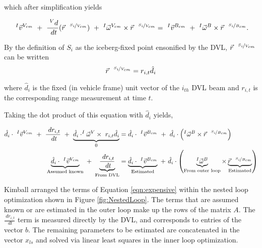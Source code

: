    which after simplification yields 
   
       \begin{equation}
    ~^{I}\vec{v}^{V_{cm}} ~+~ \frac{~^Vd}{~dt}(\vec{r}^{~~\nicefrac{S_i}{V_{cm}}} ) ~+~ ^{I}\vec{\omega}^{V_{cm}}\times\vec{r}^{~~\nicefrac{S_i}{V_{cm}}}  = 
    ~^{I}\vec{v}^{B_{cm}} ~+~^{I}\vec{\omega}^{B}\times\vec{r}^{~~\nicefrac{S_i}{B_{cm}}}. \\
\end{equation}

By the definition of $S_i$ as the iceberg-fixed point ensonified by the DVL,  $\vec{r}^{~~\nicefrac{S_i}{V_{cm}}}$ can be written 
\begin{equation}
\vec{r}^{~~\nicefrac{S_i}{V_{cm}}}= r_{i,t}\hat{d}_{i}  
\label{eqn:SiDef}
\end{equation}

where $\hat{d}_{i} $ is the fixed (in vehicle frame) unit vector of the $i_{th}$ DVL beam and $r_{i,t} $ is the corresponding range measurement at time $t$.  

Taking the dot product of this equation with $\hat{d}_{i} $ yields,

    \begin{align}
    \hat{d}_{i} \cdot~^{I}\vec{v}^{V_{cm}} ~+~ \frac{~dr_{i,t}}{~dt}  ~+~ \underbrace{\hat{d}_{i} \cdot^{I}\vec{\omega}^{V}\times{~r_{i,t}\hat{d}_{i}}}_{0}  &=
     \label{eqn:expensive}
    \hat{d}_{i} \cdot~^{I}\vec{v}^{B_{cm}} ~ + ~\hat{d}_{i} \cdot\left(^{I}\vec{\omega}^{B}\times\vec{r}^{~~\nicefrac{S_i}{B_{cm}}}\right)  \\
    \underbrace{\hat{d}_{i} \cdot~^{I}\vec{v}^{V_{cm}}}_{\text{Assumed known}} ~+~ \underbrace{\frac{~dr_{i,t}}{~dt} }_{\text{From DVL}}  &=
    \underbrace{\hat{d}_{i} \cdot~^{I}\vec{v}^{B_{cm}}}_{\text{Estimated}} ~ + ~\hat{d}_{i} \cdot\left(\underbrace{^{I}\vec{\omega}^{B}}_{\text{From outer loop}}\times\underbrace{\vec{r}^{~~\nicefrac{S_i}{B_{cm}}}}_{\text{Estimated}}\right)  
         \label{eqn:expensive2}
\end{align}

Kimball arranged the terms of Equation \ref{eqn:expensive} within the nested loop optimization shown in Figure \ref{fig:NestedLoop}. The terms that are assumed known or are estimated in the outer loop make up the rows of the matrix $A$. The $\frac{~dr_{i,t}}{~dt}$ term is measured directly by the DVL, and corresponds to entries of the vector $b$. The remaining parameters to be estimated are concatenated in the vector $x_{ls}$ and solved via linear least squares in the inner loop optimization. 

